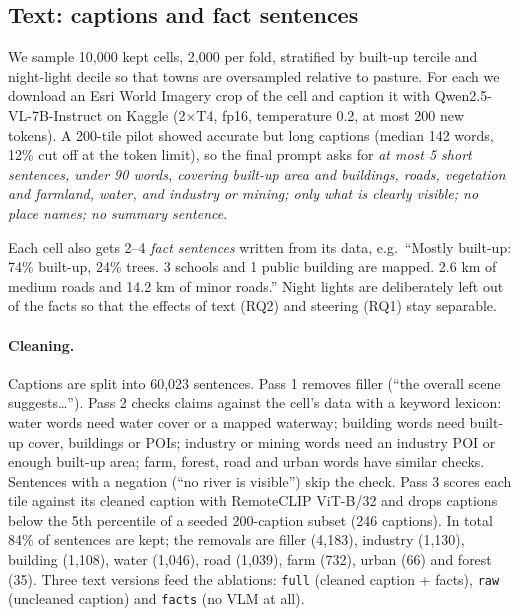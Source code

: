 \documentclass[11pt,a4paper]{article}
\begin{document}
\subsection{Text: captions and fact sentences}
We sample 10{,}000 kept cells, 2{,}000 per fold, stratified by built-up tercile and night-light decile so that towns
are oversampled relative to pasture. For each we download an Esri World Imagery crop of the cell and caption it with
Qwen2.5-VL-7B-Instruct on Kaggle (2$\times$T4, fp16, temperature 0.2, at most 200 new tokens). A 200-tile pilot showed
accurate but long captions (median 142 words, 12\% cut off at the token limit), so the final prompt asks for
\emph{at most 5 short sentences, under 90 words, covering built-up area and buildings, roads, vegetation and
farmland, water, and industry or mining; only what is clearly visible; no place names; no summary sentence}.

Each cell also gets 2--4 \emph{fact sentences} written from its data, e.g.\ ``Mostly built-up: 74\% built-up, 24\%
trees. 3 schools and 1 public building are mapped. 2.6 km of medium roads and 14.2 km of minor roads.'' Night lights
are deliberately left out of the facts so that the effects of text (RQ2) and steering (RQ1) stay separable.

\paragraph{Cleaning.} Captions are split into 60{,}023 sentences. Pass 1 removes filler (``the overall scene
suggests\ldots''). Pass 2 checks claims against the cell's data with a keyword lexicon: water words need water cover
or a mapped waterway; building words need built-up cover, buildings or POIs; industry or mining words need an
industry POI or enough built-up area; farm, forest, road and urban words have similar checks. Sentences with a
negation (``no river is visible'') skip the check. Pass 3 scores each tile against its cleaned caption with
RemoteCLIP ViT-B/32 and drops captions below the 5th percentile of a seeded 200-caption subset (246 captions). In total
84\% of sentences are kept; the removals are filler (4{,}183), industry (1{,}130), building (1{,}108), water
(1{,}046), road (1{,}039), farm (732), urban (66) and forest (35). Three text versions feed the ablations:
\texttt{full} (cleaned caption + facts), \texttt{raw} (uncleaned caption) and \texttt{facts} (no VLM at all).
\end{document}

